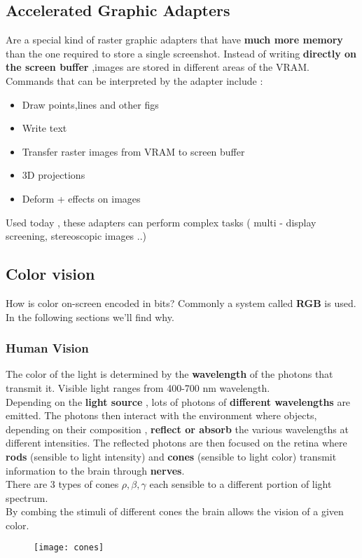 \subsection{Accelerated Graphic Adapters}
Are a special kind of raster graphic adapters that have \textbf{much more memory} than the one required to store a single screenshot. Instead of writing \textbf{directly on the screen buffer } ,images are stored in different areas of the VRAM.\\
Commands that can be interpreted by the adapter include :
\begin{itemize}
\item Draw points,lines and other figs
\item Write text
\item Transfer raster images from VRAM to screen buffer
\item 3D projections
\item Deform + effects on images
\end{itemize} 
Used today , these adapters can perform complex tasks ( multi - display screening, stereoscopic images ..)

\subsection{Color vision}
How is color on-screen encoded in bits? Commonly a system called \textbf{RGB} is used.
In the following sections we'll find why.

\subsubsection{Human Vision}
The color of the light is determined by the \textbf{wavelength} of the photons that transmit it. Visible light ranges from 400-700 nm wavelength.\\
Depending on the \textbf{light source} , lots of photons of \textbf{different wavelengths} are emitted. The photons then interact with the environment where objects, depending on their composition , \textbf{reflect or absorb} the various wavelengths at different intensities. The reflected photons are then focused on the retina where \textbf{rods} (sensible to light intensity) and \textbf{cones} (sensible to light color) transmit information to the brain through \textbf{nerves}.\\
There are 3 types of cones $ \rho , \beta ,\gamma$ each sensible to a different portion of light spectrum.\\
By combing the stimuli of different cones the brain allows the vision of a given color.
\begin{figure}[!h]
 \centering
  \texttt{[image: cones]}
\end{figure}
\newpage
